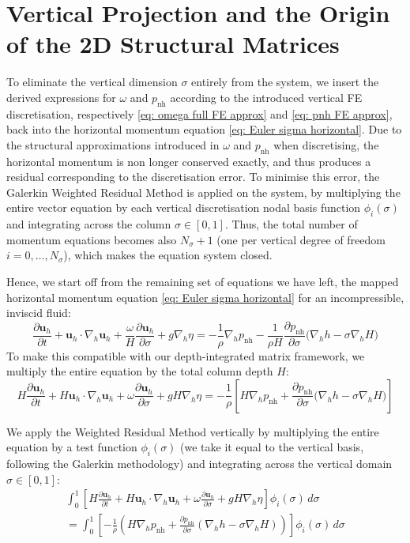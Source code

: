 \documentclass{article}
\newcommand{\Ns}{N_\sigma}
\newcommand{\uh}{\mathbf{u}_h}
\newcommand{\nablah}{\nabla_h}
\newcommand{\pnh}{p_{\text{nh}}}
\newcommand{\ddt}[1]{\frac{\partial #1}{\partial t}}
\newcommand{\dds}[1]{\frac{\partial #1}{\partial \sigma}}
\begin{document}
\section{Vertical Projection and the Origin of the 2D Structural Matrices}

To eliminate the vertical dimension $\sigma$ entirely from the system, we insert the derived expressions for $\omega$ and $\pnh$ according to the introduced vertical FE discretisation, respectively \eqref{eq: omega full FE approx} and \eqref{eq: pnh FE approx},
back into the horizontal momentum equation \eqref{eq: Euler sigma horizontal}. 
Due to the structural approximations introduced in $\omega$ and $\pnh$ when discretising, the horizontal momentum is non longer conserved exactly, and thus produces a residual corresponding to the discretisation error. 
To minimise this error, the Galerkin Weighted Residual Method is applied on the system, by multiplying the entire vector equation by each vertical discretisation nodal basis function $\phi_i(\sigma)$ and integrating across the column $\sigma \in [0, 1]$.
Thus, the total number of momentum equations becomes also $\Ns+1$ (one per vertical degree of freedom $i=0,\dots,\Ns$), which makes the equation system closed.

Hence, we start off from the remaining set of equations we have left, the mapped horizontal momentum equation \eqref{eq: Euler sigma horizontal} for an incompressible, inviscid fluid:
$$\ddt{\uh} + \uh \cdot \nablah \uh + \frac{\omega}{H}\dds{\uh} + g\nablah \eta = -\frac{1}{\rho}\nablah \pnh - \frac{1}{\rho H}\dds{\pnh}\Big(\nablah h - \sigma \nablah H\Big)$$
To make this compatible with our depth-integrated matrix framework, we multiply the entire equation by the total column depth $H$:
$$H\ddt{\uh} + H\uh \cdot \nablah \uh + \omega\dds{\uh} + gH\nablah \eta = -\frac{1}{\rho}\left[ H\nablah \pnh + \dds{\pnh}\Big(\nablah h - \sigma \nablah H\Big) \right]$$

We apply the Weighted Residual Method vertically by multiplying the entire equation by a test function $\phi_i(\sigma)$ (we take it equal to the vertical basis, following the Galerkin methodology) and integrating across the vertical domain $\sigma \in [0, 1]$:
\begin{multline}
    \int_0^1 \left[ H\ddt{\uh} + H\uh \cdot \nablah \uh + \omega\dds{\uh} + gH\nablah \eta \right] \phi_i(\sigma) \, d\sigma \\
    = \int_0^1 \left[ -\frac{1}{\rho}\left( H\nablah \pnh + \dds{\pnh}\left(\nablah h - \sigma \nablah H\right) \right) \right] \phi_i(\sigma) \, d\sigma
    \label{eq: depth integrated sigma horizontal momentum}
\end{multline}
\end{document}
